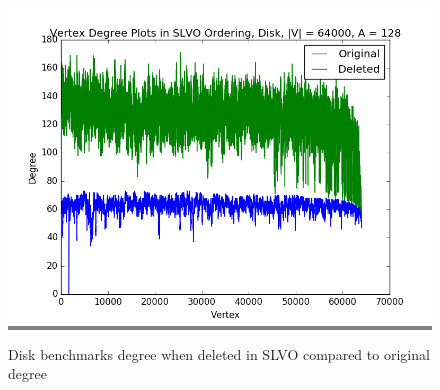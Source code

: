 \documentclass{article}
\begin{document}
\begin{figure}
\begin{minipage}{0.45\textwidth}
    \colorbox{gray}{\includegraphics[width=\linewidth]{./graphs/hist_deg_del_disk_2.png}}
    \end{minipage}

    \caption{Disk benchmarks degree when deleted in SLVO compared to original degree}
    \label{diskdegdelhists}
\end{figure}
\end{document}
